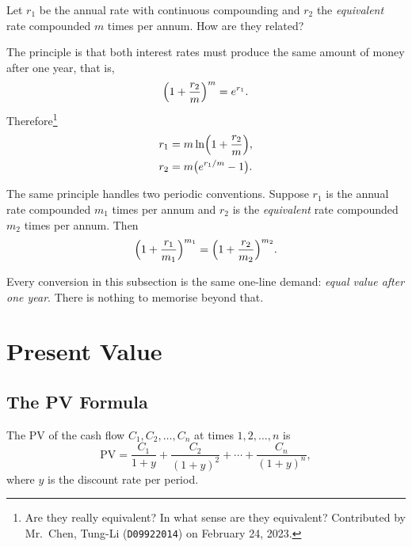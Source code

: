 Let $r_{1}$ be the annual rate with continuous compounding and $r_{2}$ the \emph{equivalent} rate compounded $m$ times per annum.
How are they related?

\begin{proposition}
	The principle is that both interest rates must produce the same amount of money after one year, that is,
	\[
		\Bigl(1+\frac{r_{2}}{m}\Bigr)^{m} = e^{r_{1}} .
	\]
	Therefore\footnote{Are they really equivalent?
	In what sense are they equivalent?
	Contributed by Mr.~Chen, Tung-Li (\texttt{D09922014}) on February 24, 2023.}
	\begin{align*}
		r_{1} & = m \ln\Bigl(1+\frac{r_{2}}{m}\Bigr), \\
		r_{2} & = m\bigl(e^{r_{1}/m}-1\bigr).
	\end{align*}
\end{proposition}

The same principle handles two periodic conventions.
Suppose $r_{1}$ is the annual rate compounded $m_{1}$ times per annum and $r_{2}$ is the \emph{equivalent} rate compounded $m_{2}$ times per annum.
Then
\begin{equation}
	\Bigl(1+\frac{r_{1}}{m_{1}}\Bigr)^{m_{1}}
	= \Bigl(1+\frac{r_{2}}{m_{2}}\Bigr)^{m_{2}} . \label{eq:conversion}
\end{equation}

\suppstart
\begin{observation}
	Every conversion in this subsection is the same one-line demand: \emph{equal value after one year}.
	There is nothing to memorise beyond that.
\end{observation}
\suppend

\section{Present Value}


\subsection{The PV Formula}

\begin{definition}
	The PV of the cash flow $C_{1}, C_{2}, \ldots, C_{n}$ at times $1, 2, \ldots, n$ is
	\begin{equation}
		\mathrm{PV} = \frac{C_{1}}{1+y} + \frac{C_{2}}{(1+y)^{2}}
		+ \cdots + \frac{C_{n}}{(1+y)^{n}} , \label{eq:pv}
	\end{equation}
	where $y$ is the discount rate per period.
\end{definition}

